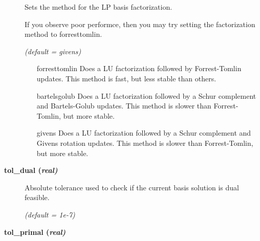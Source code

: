 \begin{description}
Sets the method for the LP basis factorization.

If you observe poor performce, then you may try setting the factorization method to forresttomlin.

\textsl{(default = givens)}
\begin{itemize}
\item[forresttomlin] 
Does a LU factorization followed by Forrest-Tomlin updates.
This method is fast, but less stable than others.
\item[bartelsgolub] 
Does a LU factorization followed by a Schur complement and Bartels-Golub updates.
This method is slower than Forrest-Tomlin, but more stable.
\item[givens] 
Does a LU factorization followed by a Schur complement and Givens rotation updates.
This method is slower than Forrest-Tomlin, but more stable.
\end{itemize}

% 
% 

\item[\label{glpktol_dual}\hypertarget{glpktol_dual}
{\textbf{tol\_dual (\slshape{real})}}]\hspace{1.0in}

Absolute tolerance used to check if the current basis solution is dual feasible.

\textsl{(default = 1e-7)}

\item[\label{glpktol_primal}\hypertarget{glpktol_primal}
{\textbf{tol\_primal (\slshape{real})}}]\hspace{1.0in}


\end{description}

